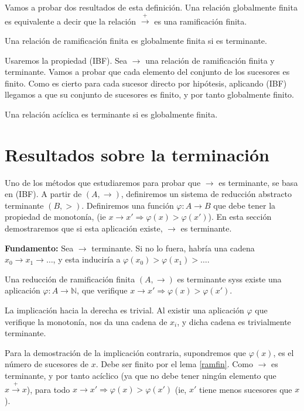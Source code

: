 
Vamos a probar dos resultados de esta definición. Una relación
globalmente finita es equivalente a decir que la relación
$\xrightarrow{+}$ es una ramificación finita.

\begin{lema} \label{ramfin} 
  Una relación de ramificación finita es globalmente finita si es terminante.
\end{lema}

\begin{demo}
  Usaremos la propiedad (IBF). Sea $\rightarrow$ una relación de
  ramificación finita y terminante. Vamos a probar que cada elemento
  del conjunto de los sucesores es finito. Como es cierto para cada
  sucesor directo por hipótesis, aplicando (IBF) llegamos a que su
  conjunto de sucesores es finito, y por tanto globalmente finito.
\end{demo}

\begin{lema} 
  Una relación acíclica es terminante si es globalmente finita.
\end{lema}

\section{Resultados sobre la terminación}

Uno de los métodos que estudiaremos para probar que $\rightarrow$ es
terminante, se basa en (IBF). A partir de $(A,\rightarrow)$, definiremos un
sistema de reducción abstracto terminante $(B,>)$. Definiremos una función
$\varphi : A \rightarrow B$ que debe tener la propiedad de monotonía, (ie
$x \rightarrow x' \Rightarrow \varphi(x) > \varphi(x') $). En esta sección
demostraremos que si esta aplicación existe, $\rightarrow$ es terminante.

\textbf{Fundamento:} Sea $\rightarrow$ terminante. Si no lo fuera, habría una
cadena $x_0 \rightarrow x_1 \rightarrow \dots$, y esta induciría a
$\varphi(x_0) > \varphi(x_1) > \dots$.

\begin{lema}
  Una reducción de ramificación finita $(A,\rightarrow)$ es terminante syss
  existe una aplicación $\varphi : A \rightarrow \mathbb{N}$, que verifique
  $x \rightarrow x' \Rightarrow \varphi(x) > \varphi(x').$
\end{lema}

\begin{demo}
  La implicación hacia la derecha es trivial. Al existir una aplicación
  $\varphi$ que verifique la monotonía, nos da una cadena de $x_i$, y dicha
  cadena es trivialmente terminante.

  Para la demostración de la implicación contraria, supondremos que
  $\varphi(x)$, es el número de sucesores de $x$. Debe ser finito por el lema
  \ref{ramfin}. Como $\rightarrow$ es terminante, y por tanto acíclico (ya que
  no debe tener ningún elemento que $x \xrightarrow{+} x$), para todo
  $x \rightarrow x' \Rightarrow \varphi(x) > \varphi(x')$ (ie, $x'$ tiene menos
  sucesores que $x$).
\end{demo}

